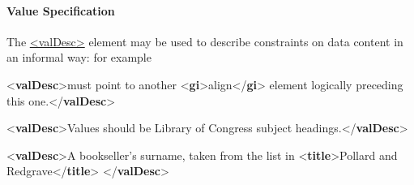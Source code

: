 \paragraph[{Value Specification}]{Value Specification}\label{TDATTvs}\par
The \hyperref[TEI.valDesc]{<valDesc>} element may be used to describe constraints on data content in an informal way: for example \par\bgroup{}\exampleFont \begin{shaded}\noindent\mbox{}{<\textbf{valDesc}>}must point to another {<\textbf{gi}>}align{</\textbf{gi}>}\mbox{}\newline 
 element logically preceding this one.{</\textbf{valDesc}>}\end{shaded}\egroup\par \noindent  \par\bgroup{}\exampleFont \begin{shaded}\noindent\mbox{}{<\textbf{valDesc}>}Values should be Library of Congress\mbox{}\newline 
 subject headings.{</\textbf{valDesc}>}\end{shaded}\egroup\par \noindent  \par\bgroup{}\exampleFont \begin{shaded}\noindent\mbox{}{<\textbf{valDesc}>}A bookseller's surname, taken from the list\mbox{}\newline 
 in {<\textbf{title}>}Pollard and Redgrave{</\textbf{title}>}\mbox{}\newline 
{</\textbf{valDesc}>}\end{shaded}\egroup\par \par
